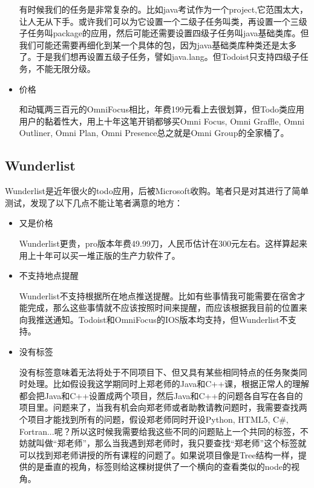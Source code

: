 \begin{itemize}
                有时候我们的任务是非常复杂的。比如java考试作为一个project,它范围太大，让人无从下手。或许我们可以为它设置一个二级子任务叫类，再设置一个三级子任务叫package的应用，然后可能还需要设置四级子任务叫java基础类库。但我们可能还需要再细化到某一个具体的包，因为java基础类库种类还是太多了。于是我们想再设置五级子任务，譬如java.lang。但Todoist只支持四级子任务，不能无限分级。

            \item 价格

                和动辄两三百元的OmniFocus相比，年费199元看上去很划算，但Todo类应用用户的黏着性大，用上十年这笔开销都够买Omni Focus, Omni Graffle, Omni Outliner, Omni Plan, Omni Presence总之就是Omni Group的全家桶了。
        \end{itemize}

    \subsection{Wunderlist}
    \label{sub:Wunderlist}
        Wunderlist是近年很火的todo应用，后被Microsoft收购。笔者只是对其进行了简单测试，发现了以下几点不能让笔者满意的地方：

        \begin{itemize}
            \item 又是价格

                Wunderlist更贵，pro版本年费49.99刀，人民币估计在300元左右。这样算起来用上十年可以买一堆正版的生产力软件了。

            \item 不支持地点提醒

                Wunderlist不支持根据所在地点推送提醒。比如有些事情我可能需要在宿舍才能完成，那么这些事情就不应该按照时间来提醒，而应该根据我目前的位置来向我推送通知。Todoist和OmniFocus的IOS版本均支持，但Wunderlist不支持。

            \item 没有标签

                没有标签意味着无法将处于不同项目下、但又具有某些相同特点的任务聚类同时处理。比如假设我这学期同时上郑老师的Java和C++课，根据正常人的理解都会把Java和C++设置成两个项目，然后Java和C++的问题各自写在各自的项目里。问题来了，当我有机会向郑老师或者助教请教问题时，我需要查找两个项目才能找到所有的问题，假设郑老师同时开设Python, HTML5, C\#, Fortran...呢？所以这时候我需要给我这些不同的问题贴上一个共同的标签，不妨就叫做“郑老师”，那么当我遇到郑老师时，我只要查找“郑老师”这个标签就可以找到郑老师讲授的所有课程的问题了。如果说项目像是Tree结构一样，提供的是垂直的视角，标签则给这棵树提供了一个横向的查看类似的node的视角。

        \end{itemize}

